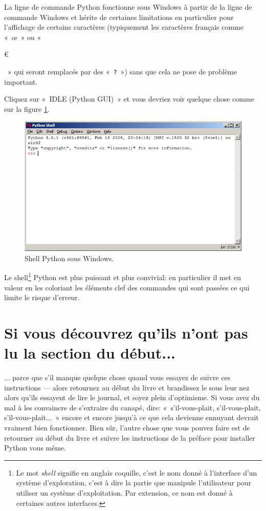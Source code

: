 La ligne de commande Python fonctionne sous Windows à partir de la ligne de commande Windows et hérite de certaines limitations en particulier pour l'affichage de certains caractères (typiquement les caractères français comme «~œ~» ou  «~\begin{small}\euro\end{small}~» qui seront remplacés par des «~\texttt{?}~») sans que cela ne pose de problème important.

Cliquez sur «~IDLE (Python GUI)~» et vous devriez voir quelque chose comme sur la figure \ref{fig:shell}.

\begin{figure}[!ht]
\centering
\includegraphics[scale=0.6]{images/shell}
\caption{Shell Python sous Windows.}\label{fig:shell}
\end{figure}

Le shell\footnote{Le mot \emph{shell} signifie en anglais coquille, c'est le nom donné à l'interface d'un système d'exploration, c'est à dire la partie que manipule l'utilisateur pour utiliser un système d'exploitation. Par extension, ce nom est donné à certaines autres interfaces.} Python est plus puissant et plus convivial: en particulier il met en valeur en les coloriant les éléments clef des commandes qui sont passées ce qui limite le risque d'erreur.

\section*{Si vous découvrez qu'ils n'ont pas lu la section du début...}

... parce que s'il manque quelque chose quand vous essayez de suivre ces instructions --- alors retournez au début du livre et brandissez le sous leur nez alors qu'ils essayent de lire le journal, et soyez plein d'optimisme. Si vous avez du mal à les convaincre de s'extraire du canapé, dire: «~s'il-vous-plait, s'il-vous-plait, s'il-vous-plait...~» encore et encore jusqu'à ce que cela devienne ennuyant devrait vraiment bien fonctionner. Bien sûr, l'autre chose que vous pouvez faire est de retourner au début du livre et suivre les instructions de la préface pour installer Python vous même.

